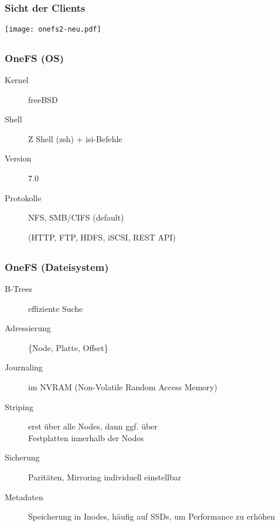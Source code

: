 \documentclass{beamer}
\begin{document}
\subsection{}
\begin{frame}[fragile]
  \frametitle{Sicht der Clients}

  \begin{center}\texttt{[image: onefs2-neu.pdf]}\end{center}

\end{frame}  

\subsection{}
\begin{frame}[fragile]
  \frametitle{OneFS (OS)}

  \begin{description}
    \item[Kernel] freeBSD
    \item[Shell] Z Shell (zsh) + isi-Befehle
    \item[Version] 7.0
    \item[Protokolle] NFS, SMB/CIFS (default)
    \item[] (HTTP, FTP, HDFS, iSCSI, REST API) 

   \end{description}

\end{frame}    

\subsection{}
\begin{frame}[fragile]
  \frametitle{OneFS (Dateisystem)}

  \begin{description}
    \item[B-Trees] effiziente Suche
    \item[Adressierung] \{Node, Platte, Offset\}
    \item[Journaling] im NVRAM (Non-Volatile Random Access Memory)
    \item[Striping] erst über alle Nodes, dann ggf. über \\Festplatten innerhalb der Nodes
    \item[Sicherung] Paritäten, Mirroring individuell einstellbar
    \item[Metadaten] Speicherung in Inodes, häufig auf SSDs, um Performance zu erhöhen
  \end{description}

\end{frame}
\end{document}
